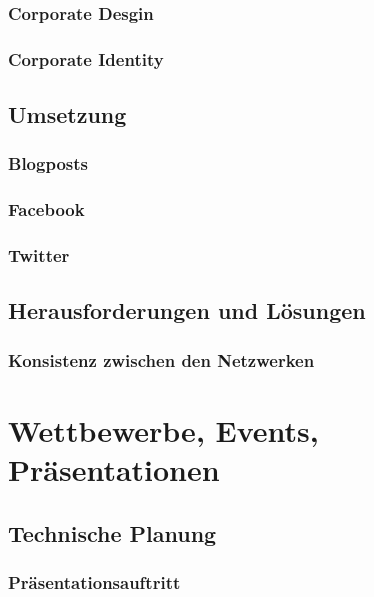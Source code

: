     \subsubsection{Corporate Desgin}

    \subsubsection{Corporate Identity}

  \subsection{Umsetzung}

    \subsubsection{Blogposts}

    \subsubsection{Facebook}

    \subsubsection{Twitter}

  \subsection{Herausforderungen und Lösungen}

    \subsubsection{Konsistenz zwischen den Netzwerken}

\section{Wettbewerbe, Events, Präsentationen}

  \subsection{Technische Planung}

    \subsubsection{Präsentationsauftritt}

